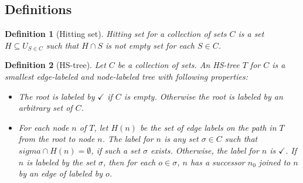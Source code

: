 \documentclass[12pt,a4paper]{article}
\newtheorem{definition}{Definition}[subsection]
\begin{document}
\subsection{Definitions}

\begin{definition}[Hitting set]
	Hitting set for a collection of sets $C$ is a set $H \subseteq U_{S \in C}$ such that $H \cap S$ is not empty set for each $S \in C$.
\end{definition}

\begin{definition}[HS-tree]
	Let $C$ be a collection of sets. An HS-tree $T$ for $C$ is a smallest edge-labeled and node-labeled tree with following properties:
	
	\begin{itemize}
		\item The root is labeled by $\checkmark$ if $C$ is empty. Otherwise the root is labeled by an arbitrary set of $C$.
		
		\item For each node $n$ of $T$, let $H(n)$ be the set of edge labels on the path in $T$ from the root to node $n$. The label for $n$ is any set $\sigma \in C$ such that $sigma \cap H(n) = \emptyset$, if such a set $\sigma$ exists. Otherwise, the label for $n$ is $\checkmark$. If $n$ is labeled by the set $\sigma$, then for each $o \in \sigma$, $n$ has a successor $n_{0}$ joined to $n$ by an edge of labeled by $o$.
	\end{itemize}
	
\end{definition}
\end{document}
